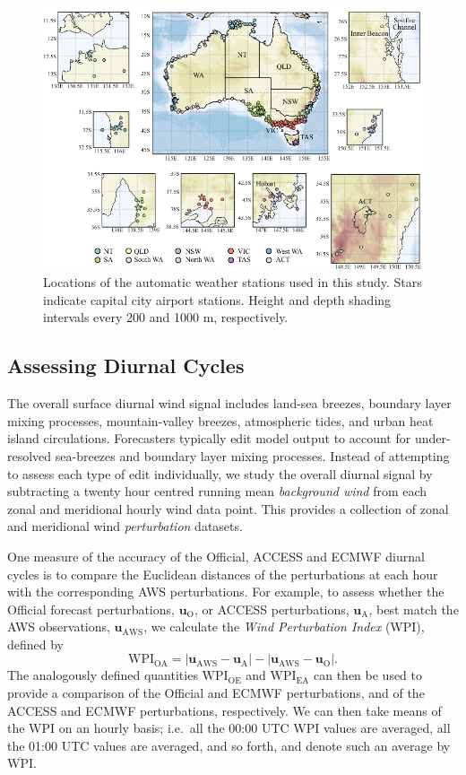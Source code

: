 \documentclass{ametsoc}
\begin{document}
\begin{figure}
\centering
\includegraphics[width=39pc]{map.pdf}
\caption{Locations of the automatic weather stations used in this study. Stars indicate capital city airport stations. Height and depth shading intervals every 200 and 1000 m, respectively.}
\label{Fig:map}
\end{figure}

\subsection{Assessing Diurnal Cycles}
The overall surface diurnal wind signal includes land-sea breezes, boundary layer mixing processes, mountain-valley breezes, atmospheric tides, and urban heat island circulations. Forecasters typically edit model output to account for under-resolved sea-breezes and boundary layer mixing processes. Instead of attempting to assess each type of edit individually, we study the overall diurnal signal by subtracting a twenty hour centred running mean \textit{background wind} from each zonal and meridional hourly wind data point. This provides a collection of zonal and meridional wind \emph{perturbation} datasets. 

One measure of the accuracy of the Official, ACCESS and ECMWF diurnal cycles is to compare the Euclidean distances of the perturbations at each hour with the corresponding AWS perturbations. For example, to assess whether the Official forecast perturbations, $\boldsymbol{u}_{\text{O}}$, or ACCESS perturbations, $\boldsymbol{u}_{\text{A}}$, best match the AWS observations, $\boldsymbol{u}_{\text{AWS}}$, we calculate the \textit{Wind Perturbation Index} (WPI), defined by 
\begin{equation}
\text{WPI}_\text{OA} = \left\lvert \boldsymbol{u}_{\text{AWS}}-\boldsymbol{u}_{\text{A}} \right\rvert - \left\lvert \boldsymbol{u}_{\text{AWS}}-\boldsymbol{u}_{\text{O}} \right\rvert. \label{Eq:WPI}
\end{equation} 
The analogously defined quantities $\text{WPI}_\text{OE}$ and $\text{WPI}_\text{EA}$ can then be used to provide a comparison of the Official and ECMWF perturbations, and of the ACCESS and ECMWF perturbations, respectively. We can then take means of the WPI on an hourly basis; i.e.~all the 00:00 UTC WPI values are averaged, all the 01:00 UTC values are averaged, and so forth, and denote such an average by $\overline{\text{WPI}}$. 
\end{document}
